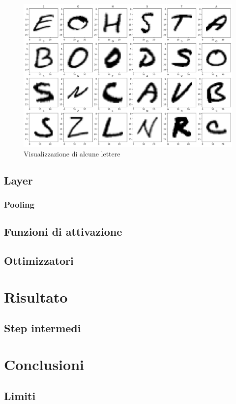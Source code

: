 \documentclass[a4paper,12pt]{article}
\begin{document}
\begin{figure}
    \centering
    \includegraphics[width=1\linewidth]{images/some_letters.png}
    \caption{Visualizzazione di alcune lettere}
    \label{some_letters}
\end{figure}

\subsection{Layer}
\subsubsection{Pooling}
\subsection{Funzioni di attivazione}
\subsection{Ottimizzatori}

\section{Risultato}
\subsection{Step intermedi}

\section{Conclusioni}
\subsection{Limiti}
\end{document}
